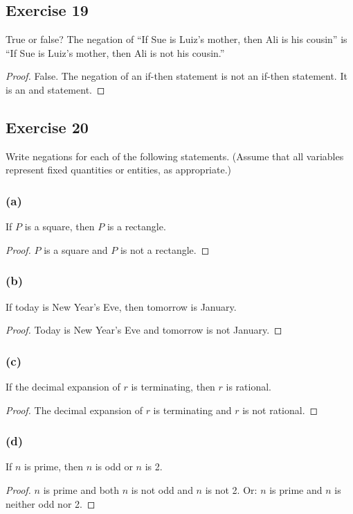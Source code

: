 \documentclass[14pt]{extarticle}
\begin{document}
\subsection{Exercise 19} True or false? The negation of “If Sue is Luiz’s
mother, then Ali is his cousin” is “If Sue is Luiz’s mother, then Ali is not his
cousin.”

\begin{proof} False. The negation of an if-then statement is not an if-then
statement. It is an and statement. \end{proof}

\subsection{Exercise 20} Write negations for each of the following statements.
(Assume that all variables represent fixed quantities or entities, as
appropriate.)

\subsubsection{(a)} If $P$ is a square, then $P$ is a rectangle.
\begin{proof} $P$ is a square and $P$ is not a rectangle. \end{proof}
\subsubsection{(b)} If today is New Year’s Eve, then tomorrow is January.
\begin{proof} Today is New Year’s Eve and tomorrow is not January. \end{proof}
\subsubsection{(c)} If the decimal expansion of $r$ is terminating, then $r$ is
rational.

\begin{proof} The decimal expansion of $r$ is terminating and $r$ is not
rational. \end{proof}

\subsubsection{(d)} If $n$ is prime, then $n$ is odd or $n$ is 2.
\begin{proof} $n$ is prime and both $n$ is not odd and $n$ is not 2. Or: $n$ is
prime and $n$ is neither odd nor 2. \end{proof}
\end{document}
